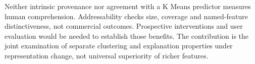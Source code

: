 Neither intrinsic provenance nor agreement with a K Means predictor measures human comprehension. Addressability checks size, coverage and named-feature distinctiveness, not commercial outcomes. Prospective interventions and user evaluation would be needed to establish those benefits. The contribution is the joint examination of separate clustering and explanation properties under representation change, not universal superiority of richer features.
